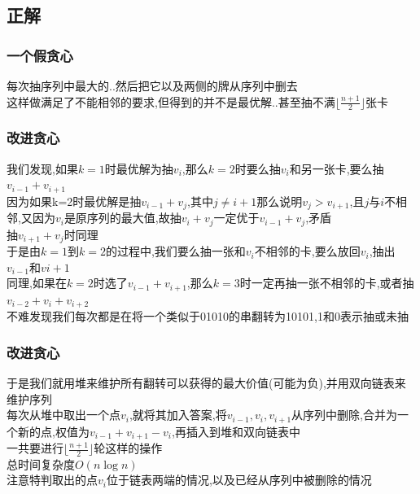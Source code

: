\documentclass{beamer}
\begin{document}
		\subsection{正解}
			\begin{frame}\frametitle{一个假贪心}
				每次抽序列中最大的..然后把它以及两侧的牌从序列中删去\\
				这样做满足了不能相邻的要求,但得到的并不是最优解..甚至抽不满$\lfloor\frac{n+1}{2}\rfloor$张卡
			\end{frame}
			\begin{frame}\frametitle{改进贪心}
				我们发现,如果$k=1$时最优解为抽$v_i$,那么$k=2$时要么抽$v_i$和另一张卡,要么抽$v_{i-1}+v_{i+1}$\\
				因为如果k=2时最优解是抽$v_{i-1}+v_j$,其中$j\neq i+1$那么说明$v_j>v_{i+1}$,且$j$与$i$不相邻,又因为$v_i$是原序列的最大值,故抽$v_i+v_j$一定优于$v_{i-1}+v_j$,矛盾\\
				抽$v_{i+1}+v_j$时同理\\
				于是由$k=1$到$k=2$的过程中,我们要么抽一张和$v_i$不相邻的卡,要么放回$v_i$,抽出$v_{i-1}$和$v{i+1}$\\
				同理,如果在$k=2$时选了$v_{i-1}+v_{i+1}$,那么$k=3$时一定再抽一张不相邻的卡,或者抽$v_{i-2}+v_i+v_{i+2}$\\
				不难发现我们每次都是在将一个类似于01010的串翻转为10101,1和0表示抽或未抽\\
			\end{frame}
			\begin{frame}\frametitle{改进贪心}
				于是我们就用堆来维护所有翻转可以获得的最大价值(可能为负),并用双向链表来维护序列\\
				每次从堆中取出一个点$v_i$,就将其加入答案,将$v_{i-1},v_i,v_{i+1}$从序列中删除,合并为一个新的点,权值为$v_{i-1}+v_{i+1}-v_i$,再插入到堆和双向链表中\\
				一共要进行$\lfloor\frac{n+1}{2}\rfloor$轮这样的操作\\
				总时间复杂度$O(n\log n)$\\
				注意特判取出的点$v_i$位于链表两端的情况,以及已经从序列中被删除的情况
			\end{frame}
\end{document}
